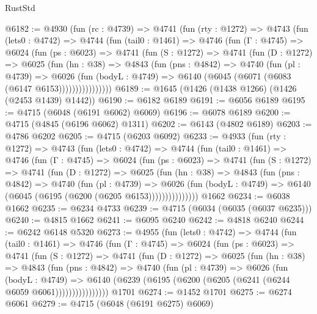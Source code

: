 \begin{lexlean}{RustStd}
\begin{coremodule}
@6182 := @4930
    (fun (rc : @4739) =>
    @4741
      (fun (rty : @1272) =>
      @4743
        (fun (lets0 : @4742) =>
        @4744
          (fun (tail0 : @1461) =>
          @4746
            (fun (Γ : @4745) =>
            @6024
              (fun (ps : @6023) =>
              @4741
                (fun (S : @1272) =>
                @4741
                  (fun (D : @1272) =>
                  @6025
                    (fun (hn : @38) =>
                    @4843
                      (fun (pns : @4842) =>
                      @4740
                        (fun (pl : @4739) =>
                        @6026
                          (fun (bodyL : @4749) =>
                          @6140 (@6045 (@6071 (@6083 (@6147 @6153))))))))))))))))
@6189 := @1645 (@1426 (@1438 @1266) (@1426 (@2453 @1439) @1442))
@6190 := @6182 @6189
@6191 := @6056 @6189
@6195 := @4715 (@6048 (@6191 @6062) @6069)
@6196 := @6078 @6189
@6200 := @4715 (@4845 (@6196 @6062) @1311)
@6202 := @6143 (@4802 @6189)
@6203 := @4786 @6202
@6205 := @4715 (@6203 @6092)
@6233 := @4933
    (fun (rty : @1272) =>
    @4743
      (fun (lets0 : @4742) =>
      @4744
        (fun (tail0 : @1461) =>
        @4746
          (fun (Γ : @4745) =>
          @6024
            (fun (ps : @6023) =>
            @4741
              (fun (S : @1272) =>
              @4741
                (fun (D : @1272) =>
                @6025
                  (fun (hn : @38) =>
                  @4843
                    (fun (pns : @4842) =>
                    @4740
                      (fun (pl : @4739) =>
                      @6026
                        (fun (bodyL : @4749) =>
                        @6140 (@6045 (@6195 (@6200 (@6205 @6153)))))))))))))))
    @1662
@6234 := @6038 @1662
@6235 := @6234 @4733
@6239 := @4715 (@6034 (@6035 (@6037 @6235)))
@6240 := @4815 @1662
@6241 := @6095 @6240
@6242 := @4818 @6240
@6244 := @6242 @6148 @5320
@6273 := @4955
    (fun (lets0 : @4742) =>
    @4744
      (fun (tail0 : @1461) =>
      @4746
        (fun (Γ : @4745) =>
        @6024
          (fun (ps : @6023) =>
          @4741
            (fun (S : @1272) =>
            @4741
              (fun (D : @1272) =>
              @6025
                (fun (hn : @38) =>
                @4843
                  (fun (pns : @4842) =>
                  @4740
                    (fun (pl : @4739) =>
                    @6026
                      (fun (bodyL : @4749) =>
                      @6140 (@6239 (@6195 (@6200 (@6205 (@6241 (@6244 @6059 @6061))))))))))))))))
    @1701
@6274 := @1452 @1701
@6275 := @6274 @6061
@6279 := @4715 (@6048 (@6191 @6275) @6069)

\end{coremodule}
\end{lexlean}
